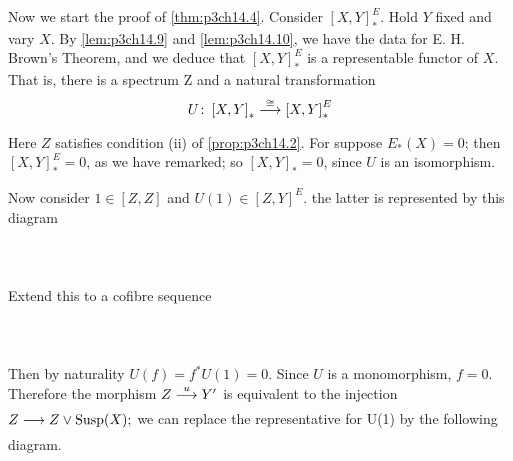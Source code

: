 \documentclass[../main]{subfiles}
\begin{document}
Now we start the proof of \ref{thm:p3ch14.4}. Consider $ \left[X,Y\right]^E_{\ast}$. Hold $Y$ fixed and vary $X$. By \ref{lem:p3ch14.9} and \ref{lem:p3ch14.10}, we have the data for E. H. Brown's Theorem, and we deduce that  $ \left[X,Y\right]^E_{\ast}$ is a representable functor of $X$. That is, there is a spectrum Z and a natural transformation
\[
U\colon  \left[X,Y\right]_{\ast} \vra{\cong}  \left[X,Y\right]^E_{\ast}
\] 
Here $Z$ satisfies condition (ii) of \ref{prop:p3ch14.2}. For suppose $E_{\ast}(X)=0$; then $ \left[X,Y\right]^E_{\ast}=0$, as we have remarked; so $ \left[X,Y\right]_{\ast}=0$, since $U$ is an isomorphism.

Now consider $1 \in \left[ Z,Z \right] $ and $U(1) \in \left[Z,Y\right]^E  $. the latter is represented by this diagram
~\\~\\
~\\~\\
Extend this to a cofibre sequence 
~\\~\\
~\\~\\
Then by naturality $U(f)=f^\ast U(1)=0$. Since $U$ is a monomorphism, $f=0$. Therefore the morphism $Z\vra{u} Y'  $ is equivalent to the injection $Z  \lar{} Z \vee \te{Susp}(X);$ we can replace the representative for U(1) by the following diagram.
~\\~\\
~\\~\\
\end{document}
